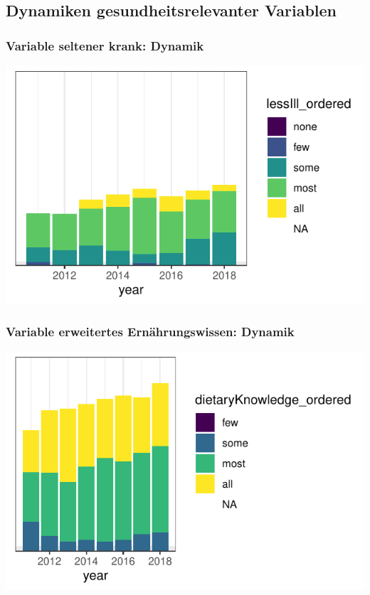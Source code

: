 \subsection{Dynamiken gesundheitsrelevanter Variablen}

\begin{frame}[fragile]
\frametitle{Variable \glqq seltener krank\grqq: Dynamik}
\begin{knitrout}\footnotesize
{}\color{fgcolor}

{\centering \includegraphics[width=\maxwidth]{figure/beamer-lessIllTime-1} 

}



\end{knitrout}
\end{frame}

\begin{frame}[fragile]
\frametitle{Variable \glqq erweitertes Ernährungswissen\grqq: Dynamik}
\begin{knitrout}\footnotesize
{}\color{fgcolor}

{\centering \includegraphics[width=\maxwidth]{figure/beamer-dietaryTime-1} 

}



\end{knitrout}
\end{frame}


